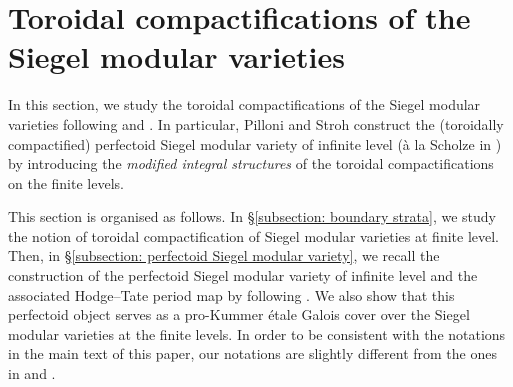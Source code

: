 \section{Toroidal compactifications of the Siegel modular varieties}\label{section: boundary}
In this section, we study the toroidal compactifications of the Siegel modular varieties following \cite{Stroh-TorComp} and \cite{Pilloni-Stroh-CoherentCohomologyandGaloisRepresentations}. In particular, Pilloni and Stroh construct the (toroidally compactified) perfectoid Siegel modular variety of infinite level (\`a la Scholze in \cite{Scholze-2015}) by introducing the \emph{modified integral structures} of the toroidal compactifications on the finite levels.

This section is organised as follows. In \S \ref{subsection: boundary strata}, we study the notion of toroidal compactification of Siegel modular varieties at finite level. Then, in \S \ref{subsection: perfectoid Siegel modular variety}, we recall the construction of the perfectoid Siegel modular variety of infinite level and the associated Hodge--Tate period map by following \cite{Pilloni-Stroh-CoherentCohomologyandGaloisRepresentations}. We also show that this perfectoid object serves as a pro-Kummer \'etale Galois cover over the Siegel modular varieties at the finite levels. In order to be consistent with the notations in the main text of this paper, our notations are slightly different from the ones in \cite{Stroh-TorComp} and \cite{Pilloni-Stroh-CoherentCohomologyandGaloisRepresentations}. 

